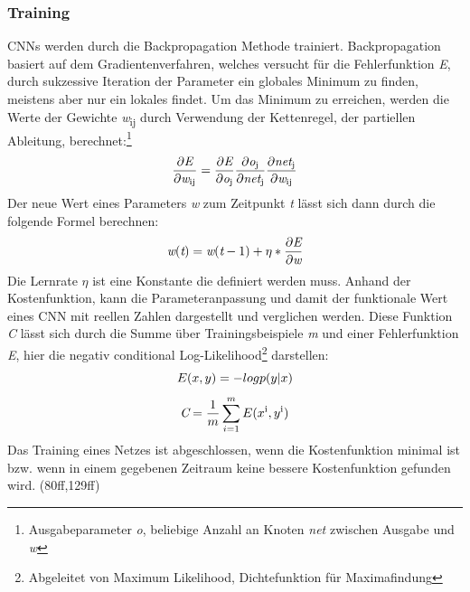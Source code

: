 \documentclass[twosided,a4,10pt]{article}
\begin{document}
\begin{multicols}{2}
		\subsubsection{Training}
		CNNs werden durch die Backpropagation Methode trainiert. Backpropagation basiert auf dem Gradientenverfahren, welches versucht für die Fehlerfunktion \textit{E}, durch sukzessive Iteration der Parameter ein globales Minimum zu finden, meistens aber nur ein lokales findet. Um das Minimum zu erreichen, werden die Werte der Gewichte \textit{w}\textsubscript{ij} durch Verwendung der Kettenregel, der partiellen Ableitung, berechnet:\footnote[12]{Ausgabeparameter \textit{o}, beliebige Anzahl an Knoten \textit{net} zwischen Ausgabe und \textit{w}}
		\begin{equation*}
		\centering
		\frac{\partial\textit{E}}{\partial\textit{w}\textsubscript{ij}} = \frac{\partial\textit{E}}{\partial\textit{o}\textsubscript{j}} \frac{\partial\textit{o}\textsubscript{j}}{\partial\textit{net}\textsubscript{j}}  \frac{\partial\textit{net}\textsubscript{j}}{\partial\textit{w}\textsubscript{ij}} 
		\end{equation*}\newline
		Der neue Wert eines Parameters \textit{w} zum Zeitpunkt \textit{t} lässt sich dann durch die folgende Formel berechnen:
		\begin{equation*}
		\centering
		\textit{w}(\textit{t}) = \textit{w}(\textit{t}-1) + \eta * \frac{\partial\textit{E}}{\partial\textit{w}} 
		\end{equation*}
		Die Lernrate $\eta$ ist eine Konstante die definiert werden muss.\newline
		Anhand der Kostenfunktion, kann die Parameteranpassung und damit der funktionale Wert eines CNN mit reellen Zahlen dargestellt und verglichen werden. Diese Funktion \textit{C} lässt sich durch die Summe über Trainingsbeispiele \textit{m} und einer Fehlerfunktion \textit{E}, hier die negativ conditional Log-Likelihood\footnote[13]{Abgeleitet von Maximum Likelihood, Dichtefunktion für Maximafindung} darstellen: 
		\begin{equation*}
			\centering
			E(x,y) = -log p(y|x)
		\end{equation*}
		\begin{equation*}
			\centering
			\textit{C} = \frac{1}{m}\sum_{i=1}^{m}E(x\textsuperscript{i},y\textsuperscript{i})
		\end{equation*}
		Das Training eines Netzes ist abgeschlossen, wenn die Kostenfunktion minimal ist bzw. wenn in einem gegebenen Zeitraum keine bessere Kostenfunktion gefunden wird. \cite{goodfellow}(80ff,129ff)

\end{multicols}
\end{document}
